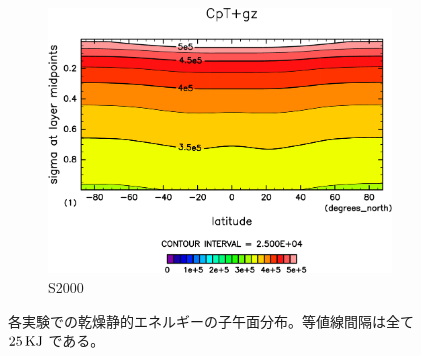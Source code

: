 \documentclass[body]{subfiles}
\begin{document}
\begin{figure}[t]
\begin{subfigure}{.4\textwidth}
		\centering
		\includegraphics[width=\columnwidth]{S2000/CpT+gz,time=7300:7665-crop-rotate.pdf}
		\caption{S2000}\label{CpT+gzS2000}
	\end{subfigure}
	\caption[各実験での乾燥静的エネルギーの子午面分布]{
		各実験での乾燥静的エネルギーの子午面分布。等値線間隔は全て \(25\hmu{KJ}\) である。
	}\label{Cp+gz}
\end{figure}
\end{document}
